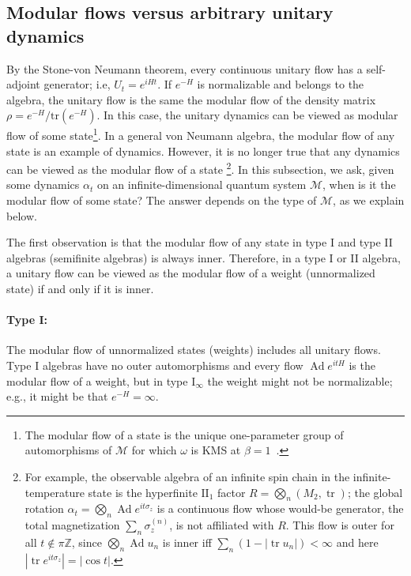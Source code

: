 \documentclass[a4paper,11pt]{article}
\theoremstyle{definition}
\newcommand{\mM}{\mathcal{M}}
\newcommand{\tr}{\text{tr}}
\begin{document}
\subsection{Modular flows versus arbitrary unitary dynamics}\label{sec:modular-vs-dynamics}

By the Stone-von Neumann theorem, every continuous unitary flow has a self-adjoint generator; i.e, $U_t=e^{i H t}$. If $e^{-H}$ is normalizable and belongs to the algebra, the unitary flow is the same the modular flow of the density matrix $\rho=e^{-H}/\tr(e^{-H})$. In this case, the unitary dynamics can be viewed as modular flow of some state\footnote{The modular flow of a state is the unique one-parameter group of automorphisms of $\mM$ for which $\omega$ is KMS at $\beta=1$~\cite{Takesaki1970}.}. In a general von Neumann algebra, the modular flow of any state is an example of dynamics. However, it is no longer true that any dynamics can be viewed as the modular flow of a state \footnote{For example, the observable algebra of an infinite spin chain in the infinite-temperature state is the hyperfinite $\mathrm{II}_1$ factor $R=\bigotimes_n(M_2,\operatorname{tr})$; the global rotation $\alpha_t=\bigotimes_n\operatorname{Ad}e^{it\sigma_z}$ is a continuous flow whose would-be generator, the total magnetization $\sum_n\sigma_z^{(n)}$, is not affiliated with $R$. This flow is outer for all $t\notin\pi\mathbb Z$, since $\bigotimes_n\operatorname{Ad}u_n$ is inner iff $\sum_n(1-|\operatorname{tr}u_n|)<\infty$ and here $|\operatorname{tr}e^{it\sigma_z}|=|\cos t|$.}. In this subsection, we ask, given some dynamics $\alpha_t$ on an infinite-dimensional quantum system $\mM$, when is it the modular flow of some state? The answer depends on the type of $\mM$, as we explain below.

The first observation is that the modular flow of any state in type I and type II algebras (semifinite algebras) is always inner. 
Therefore, in a type I or II algebra, a unitary flow can be viewed as the modular flow of a weight (unnormalized state) if and only if it is inner. 

\paragraph{Type I:} The modular flow of unnormalized states (weights) includes all unitary flows.
Type I algebras have no outer automorphisms and every flow $\operatorname{Ad}e^{itH}$ is the modular flow of a weight, but in type I$_\infty$ the weight might not be normalizable; e.g., it might be that $e^{-H}=\infty$.
\end{document}
